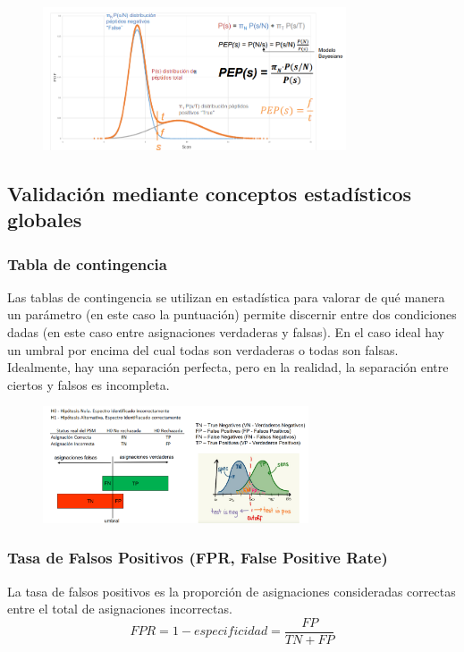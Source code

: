 \begin{figure}[h]
\centering
\includegraphics[width = 0.8\textwidth]{figs/bayesiano.png}
\end{figure}

\subsection{Validación mediante conceptos estadísticos globales}
\subsubsection{Tabla de contingencia}
Las tablas de contingencia se utilizan en estadística para valorar de qué manera un parámetro (en este caso la puntuación) permite discernir entre dos condiciones dadas (en este caso entre asignaciones verdaderas y falsas). En el caso ideal hay un umbral por encima del cual todas son verdaderas o todas son falsas. Idealmente, hay una separación perfecta, pero en la realidad, la separación entre ciertos y falsos es incompleta.

\begin{figure}[h]
\centering
\includegraphics[width = 0.7\textwidth]{figs/contingencia.png}
\end{figure}

\subsubsection{Tasa de Falsos Positivos (FPR, False Positive Rate)}
La tasa de falsos positivos es la proporción de asignaciones consideradas correctas entre el total de asignaciones incorrectas.
$$FPR = 1 - especificidad = \frac{FP}{TN + FP}$$

